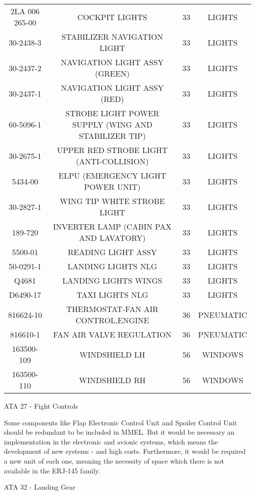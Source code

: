 \begin{table}[htbp]
\begin{tabular}{cccc}
    2LA 006 265-00 & COCKPIT LIGHTS & 33    & LIGHTS \\
    30-2438-3 & STABILIZER NAVIGATION LIGHT & 33    & LIGHTS \\
    30-2437-2 & NAVIGATION LIGHT ASSY (GREEN) & 33    & LIGHTS \\
    30-2437-1 & NAVIGATION LIGHT ASSY (RED) & 33    & LIGHTS \\
    60-5096-1 & STROBE LIGHT POWER SUPPLY (WING AND STABILIZER TIP) & 33    & LIGHTS \\
    30-2675-1 & UPPER RED STROBE LIGHT (ANTI-COLLISION) & 33    & LIGHTS \\
    5434-00 & ELPU (EMERGENCY LIGHT POWER UNIT) & 33    & LIGHTS \\
    30-2827-1 & WING TIP WHITE STROBE LIGHT & 33    & LIGHTS \\
    189-720 & INVERTER LAMP (CABIN PAX AND LAVATORY) & 33    & LIGHTS \\
    5500-01 & READING LIGHT ASSY & 33    & LIGHTS \\
    50-0291-1 & LANDING LIGHTS NLG & 33    & LIGHTS \\
    Q4681 & LANDING LIGHTS WINGS & 33    & LIGHTS \\
    D6490-17 & TAXI LIGHTS NLG & 33    & LIGHTS \\
    816624-10 & THERMOSTAT-FAN AIR CONTROL,ENGINE & 36    & PNEUMATIC \\
    816610-1 & FAN AIR VALVE REGULATION & 36    & PNEUMATIC \\
    163500-109 & WINDSHIELD LH & 56    & WINDOWS \\
    163500-110 & WINDSHIELD RH & 56    & WINDOWS \\
    \bottomrule
    \end{tabular}%
  \label{tab:repComponentList}%
\end{table}%


ATA 27 - Fight Controls


Some components like Flap Electronic Control Unit and Spoiler Control Unit should be redundant  to be included in MMEL. But it would be necessary an implementation in the electronic and avionic systems, which means the development of new systems - and high costs. Furthermore, it would be required a new unit of each one, meaning the necessity of space which there is not available in the ERJ-145 family.


ATA 32 - Landing Gear


